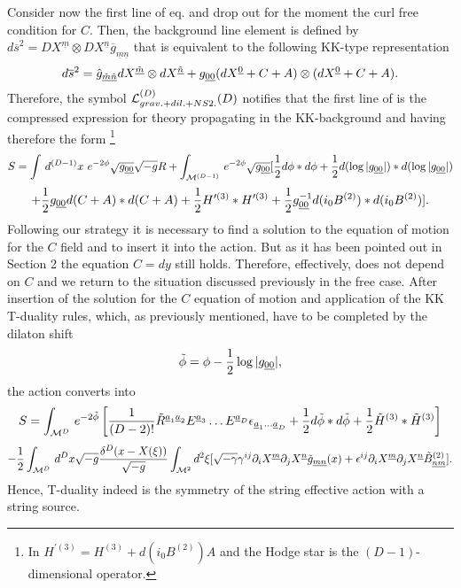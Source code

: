 \documentclass[a4paper,11pt]{article}
\begin{document}
Consider now the first line of eq.  and drop out for the moment the
curl free condition for $C$. Then, the background line element is defined by
$d{\overline s}^2=DX^{\underline m}\otimes DX^{\underline n}
{\overline g}_{\underline{m}\underline{n}}$ that is equivalent to the following
KK-type representation
\begin{equation}\plabel{KKint}
d{\overline s}^2={\hat g}_{\underline{\tilde m}\underline{\tilde n}}
dX^{\underline{\tilde m}}\otimes dX^{\underline{\tilde n}}+
g_{\underline{00}}(dX^{\underline 0}+C+A)\otimes
(dX^{\underline 0}+C+A).
\end{equation}
Therefore, the symbol ${\cal L}^{(D)}_{grav.+dil.+NS2.}(D)$ notifies that the
first line of  is the compressed expression for theory
propagating in the KK-background 
and having therefore the form
\footnote{In  $H^{\prime (3)}=H^{(3)}+d(i_0 B^{(2)}) A$ and the Hodge 
star is the $(D-1)$-dimensional operator.}
$$
S=\int\, d^{(D-1)}x~ e^{-2\phi}\sqrt{g_{\underline{00}}}
\sqrt{-{g}}R
+\int_{{\cal M}^{(D-1)}}\, e^{-2\phi}\sqrt{g_{\underline{00}}}
[{1\over 2}d\phi \ast d\phi
+{1\over 2}d(\log |g_{\underline{00}}|) \ast d(\log |g_{\underline{00}}|)
$$
\begin{equation}\plabel{RKK}
+{1\over 2}g_{\underline{00}}
d(C+A)\ast d(C+A)
+{1\over 2}H^{\prime (3)}\ast H^{\prime (3)}+
{1\over 2}g^{-1}_{\underline{00}}d(i_0 B^{(2)})\ast d(i_0 B^{(2)})].
\end{equation}
Following our strategy it is necessary to find a solution to the equation of 
motion for the $C$ field and to insert it into the action. But as it has been 
pointed out in Section 2 the equation $C=dy$ still holds. Therefore, 
effectively,  does not
depend on $C$ and we return to the situation discussed previously in the
free case. After insertion of the solution for the $C$ equation of motion 
and application of the KK T-duality rules, which, as previously mentioned,
have to be completed by the dilaton shift
\begin{equation}\plabel{Tdil}
\tilde{\phi}=\phi-{1\over 2}\log |g_{\underline{00}}|,
\end{equation}
the action  converts into
$$
S=\int_{{\cal M}^D}\, e^{-2\tilde{\phi}}
\left[ {1\over (D-2)!}\tilde{R}^{{\underline
a}_1{\underline a}_2}E^{{\underline a}_3}\dots E^{{\underline
a}_D}\epsilon_{{\underline a}_1\dots {\underline a}_D} 
+{1\over 2}d\tilde{\phi} \ast d\tilde{\phi}
+{1\over 2}{\tilde H}^{(3)}\ast {\tilde H}^{(3)}\right]
$$
\begin{equation}\plabel{Seffdual}
-{1\over 2}\int_{{\cal M}^D}\,d^D x \sqrt{-g}{\d^D (x-X(\xi))\over
\sqrt{-g}}
\int_{{\cal M}^2} d^2 \xi
[\sqrt{-\g}\g^{ij}\partial_i X^{\underline m}
\partial_j X^{\underline n}\tilde{g}_{\underline{mn}}(x)
+\e^{ij}\partial_i X^{\underline m}\partial_j X^{\underline n}
\tilde{B}^{(2)}_{\underline{n}\underline{m}}].
\end{equation}
Hence, T-duality indeed is the symmetry of the string effective action with
a string source.
\end{document}
